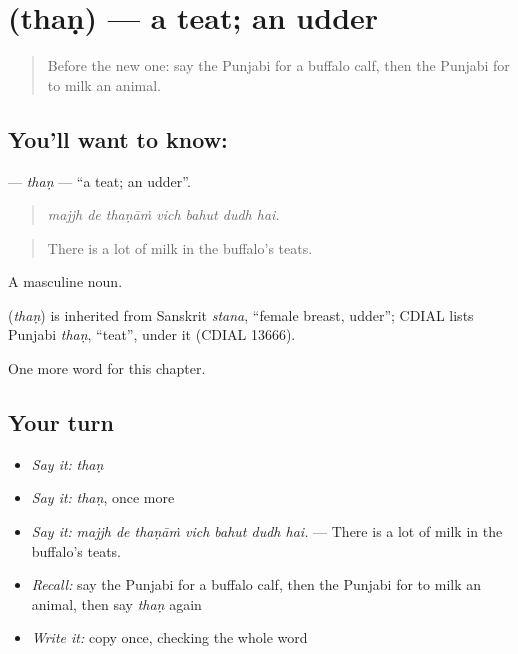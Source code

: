 \section[\texorpdfstring{\pa{ਥਣ} (thaṇ)}{ਥਣ (thaṇ)}]{ (thaṇ) — a teat; an udder}

\label{lesson:PA-C307-than}



\begin{quote}
Before the new one: say the Punjabi for a buffalo calf, then the Punjabi for to milk an animal.
\end{quote}

\subsection*{You'll want to know: }
\textbf{} — \emph{thaṇ} — \textquotedblleft{}a teat; an udder\textquotedblright{}.

\begin{quote}
      
\end{quote}

\begin{quote}
\emph{majjh de thaṇāṁ vich bahut dudh hai.}
\end{quote}

\begin{quote}
There is a lot of milk in the buffalo's teats.
\end{quote}

A masculine noun.

\begin{cousinweb}
\textbf{} (\emph{thaṇ}) is inherited from Sanskrit \emph{stana}, \textquotedblleft{}female breast, udder\textquotedblright{}; CDIAL lists Punjabi \emph{thaṇ}, \textquotedblleft{}teat\textquotedblright{}, under it (CDIAL 13666).
\end{cousinweb}

\begin{grammarlens}[title={What you've built}]
One more word for this chapter.
\end{grammarlens}

\subsection*{Your turn}
\begin{itemize}
\raggedright
  \item \emph{Say it:} \emph{thaṇ}
  \item \emph{Say it:} \emph{thaṇ}, once more
  \item \emph{Say it:} \emph{majjh de thaṇāṁ vich bahut dudh hai.} — There is a lot of milk in the buffalo's teats.
  \item \emph{Recall:} say the Punjabi for a buffalo calf, then the Punjabi for to milk an animal, then say \emph{thaṇ} again
  \item \emph{Write it:} copy \textbf{} once, checking the whole word
\end{itemize}

